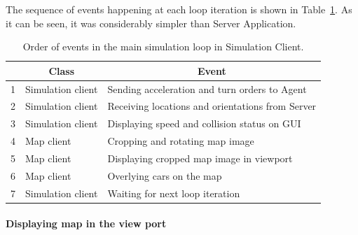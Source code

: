 \documentclass[11pt,english,twoside]{article}
\begin{document}
The sequence of events happening at each loop iteration is shown in Table~\ref{table:clients_events}. As it can be seen, it was considerably simpler than Server Application. 

\begin{table}[!]
\centering
\begin{tabular}{|l|l|l|}
\hline
\multicolumn{1}{|c|}{\textbf{}} & \multicolumn{1}{c|}{\textbf{Class}} & \multicolumn{1}{c|}{\textbf{Event}}              \\ \hline
1                               & Simulation client                   & Sending acceleration and turn orders to Agent    \\ \hline
2                               & Simulation client                   & Receiving locations and orientations from Server \\ \hline
3                               & Simulation client                   & Displaying speed and collision status on GUI     \\ \hline
4                               & Map client                          & Cropping and rotating map image                  \\ \hline
5                               & Map client                          & Displaying cropped map image in viewport         \\ \hline
6                               & Map client                          & Overlying cars on the map                        \\ \hline
7                               & Simulation client                   & Waiting for next loop iteration                  \\ \hline
\end{tabular}
\caption{Order of events in the main simulation loop in Simulation Client.}
\label{table:clients_events}
\end{table}


\paragraph{Displaying map in the view port}
\end{document}
